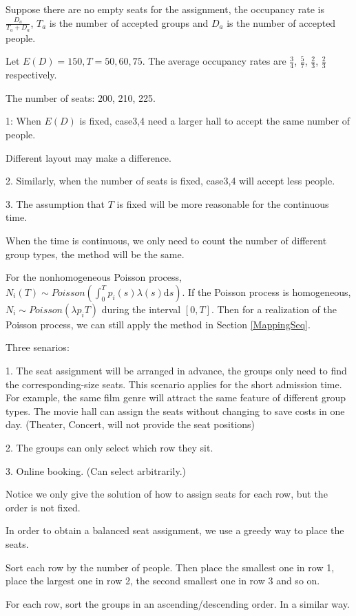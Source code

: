 Suppose there are no empty seats for the assignment, the occupancy rate is $\frac{D_{a}}{T_a + D_{a}}$, $T_a$ is the number of accepted groups and $D_a$ is the number of accepted people.

Let $E(D) = 150, T = 50, 60, 75$. The average occupancy rates are $\frac{3}{4}$, $\frac{5}{7}$, $\frac{2}{3}$, $\frac{2}{3}$ respectively.

The number of seats: 200, 210, 225.

1: When $E(D)$ is fixed, case3,4 need a larger hall to accept the same number of people.

Different layout may make a difference.

2. Similarly, when the number of seats is fixed, case3,4 will accept less people.

3. The assumption that $T$ is fixed will be more reasonable for the continuous time. 

When the time is continuous, we only need to count the number of different group types, the method will be the same.

For the nonhomogeneous Poisson process, $N_{i}(T) \sim Poisson (\int_0^{T} p_i(s)\lambda(s) \mathrm{d} s)$. If the Poisson process is homogeneous, $N_{i} \sim Poisson(\lambda p_i T)$ during the interval $[0, T]$. Then for a realization of the Poisson process, we can still apply the method in Section \ref{MappingSeq}.

Three senarios:

1. The seat assignment will be arranged in advance, the groups only need to find the corresponding-size seats. This scenario applies for the short admission time. For example, the same film genre will attract the same feature of different group types. The movie hall can assign the seats without changing to save costs in one day. (Theater, Concert, will not provide the seat positions)

2. The groups can only select which row they sit.

3. Online booking. (Can select arbitrarily.)


Notice we only give the solution of how to assign seats for each row, but the order is not fixed.

In order to obtain a balanced seat assignment, we use a greedy way to place the seats.

Sort each row by the number of people. Then place the smallest one in row 1, place the largest one in row 2, the second smallest one in row 3 and so on. 

For each row, sort the groups in an ascending/descending order. In a similar way.

